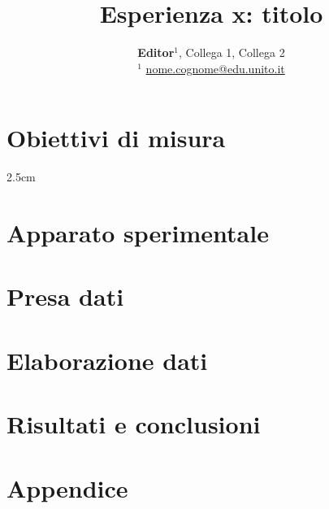 \documentclass[a4paper,10pt]{article}
\title{\vspace*{5pt}\Huge{\textbf{Esperienza x: titolo}}}
\author{\textbf{Editor}$^1$, Collega 1, Collega 2\\
	\vspace*{5pt}\small{$^{1}$ \url{nome.cognome@edu.unito.it}}}
\date{}
\makeatletter
\renewcommand{\maketitle}{\bgroup\setlength{\parindent}{0pt}
\begin{flushleft}
    \textbf{\@title}

    \vspace{10pt}
    \@author
\end{flushleft}\egroup
}
\makeatother
\begin{document}
\maketitle

\section*{Obiettivi di misura}
\begin{adjustwidth}{}{2.5cm} %
\lipsum[1]

\end{adjustwidth}
\noindent\hrulefill

\begin{multicols}{2}

\section{Apparato sperimentale}
\lipsum[1]

\section{Presa dati}
\lipsum[1]

\section{Elaborazione dati}
\lipsum[1]

\section{Risultati e conclusioni}
\lipsum[1]

\section{Appendice}
\lipsum[1]


\begin{thebibliography}{9}
\bibitem{}{}

\end{thebibliography}

\end{multicols}
\end{document}
